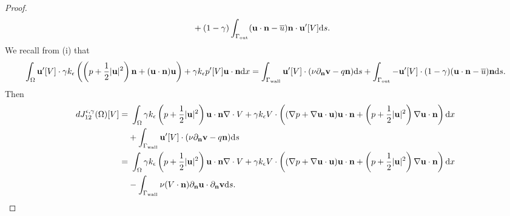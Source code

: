 \documentclass[oneside,11pt]{book}
\numberwithin{equation}{section}
\newtheorem{remark}{Remark}[section]
\begin{document}
\begin{proof}
\begin{align}
        &+ (1 - \gamma)\int_{\Gamma_{\rm out}} ({\bf u}\cdot{\bf n} - \overline{u}){\bf n}\cdot{\bf u}'[V]{\rm d}s.
    \end{align}
    We recall from (i) that
    \begin{align*}
        \int_\Omega {\bf u}'[V]\cdot\gamma k_\epsilon\left(\left(p + \frac{1}{2}|{\bf u}|^2\right){\bf n} + ({\bf u}\cdot{\bf n}){\bf u}\right) + \gamma k_\epsilon p'[V]{\bf u}\cdot{\bf n}{\rm d}x = \int_{\Gamma_{\rm wall}} {\bf u}'[V]\cdot(\nu\partial_{\bf n}{\bf v} - q{\bf n}){\rm d}s + \int_{\Gamma_{\rm out}} -{\bf u}'[V]\cdot(1 - \gamma)({\bf u}\cdot{\bf n} - \overline{u}){\bf n}{\rm d}s.
    \end{align*}
    Then
    \begin{align*}
        dJ_{12}^{\epsilon,\gamma}(\Omega)[V] =&\ \int_\Omega \gamma k_\epsilon\left(p + \frac{1}{2}|{\bf u}|^2\right){\bf u}\cdot{\bf n}\nabla\cdot V + \gamma k_\epsilon V\cdot\left((\nabla p + \nabla{\bf u}\cdot{\bf u}){\bf u}\cdot{\bf n} + \left(p + \frac{1}{2}|{\bf u}|^2\right)\nabla{\bf u}\cdot{\bf n}\right){\rm d}x\\
        &+ \int_{\Gamma_{\rm wall}} {\bf u}'[V]\cdot(\nu\partial_{\bf n}{\bf v} - q{\bf n}){\rm d}s\\
        =&\ \int_\Omega \gamma k_\epsilon\left(p + \frac{1}{2}|{\bf u}|^2\right){\bf u}\cdot{\bf n}\nabla\cdot V + \gamma k_\epsilon V\cdot\left((\nabla p + \nabla{\bf u}\cdot{\bf u}){\bf u}\cdot{\bf n} + \left(p + \frac{1}{2}|{\bf u}|^2\right)\nabla{\bf u}\cdot{\bf n}\right){\rm d}x\\
        &- \int_{\Gamma_{\rm wall}} \nu(V\cdot{\bf n})\partial_{\bf n}{\bf u}\cdot\partial_{\bf n}{\bf v}{\rm d}s.
    \end{align*}
\end{proof}

\end{document}
